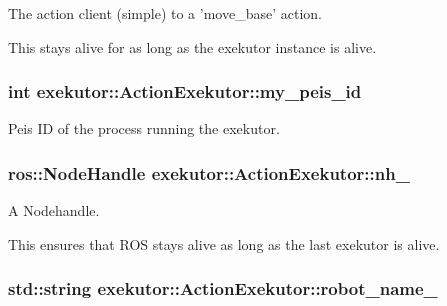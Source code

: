 \-The action client (simple) to a 'move\-\_\-base' action. 

\-This stays alive for as long as the exekutor instance is alive. \hypertarget{classexekutor_1_1ActionExekutor_a31644a88e4d0166c2d3a70bab9eb5b99}{
\subsubsection[{my\-\_\-peis\-\_\-id}]{\setlength{\rightskip}{0pt plus 5cm}int {\bf exekutor\-::\-Action\-Exekutor\-::my\-\_\-peis\-\_\-id}}}\label{classexekutor_1_1ActionExekutor_a31644a88e4d0166c2d3a70bab9eb5b99}


\-Peis \-I\-D of the process running the exekutor. 

\hypertarget{classexekutor_1_1ActionExekutor_a1f0541608c4f27f3c72ab22b1874c882}{
\subsubsection[{nh\-\_\-}]{\setlength{\rightskip}{0pt plus 5cm}ros\-::\-Node\-Handle {\bf exekutor\-::\-Action\-Exekutor\-::nh\-\_\-}}}\label{classexekutor_1_1ActionExekutor_a1f0541608c4f27f3c72ab22b1874c882}


\-A \-Nodehandle. 

\-This ensures that \-R\-O\-S stays alive as long as the last exekutor is alive. \hypertarget{classexekutor_1_1ActionExekutor_af165894bbbbabd62c17be857be095936}{
\subsubsection[{robot\-\_\-name\-\_\-}]{\setlength{\rightskip}{0pt plus 5cm}std\-::string {\bf exekutor\-::\-Action\-Exekutor\-::robot\-\_\-name\-\_\-}}}\label{classexekutor_1_1ActionExekutor_af165894bbbbabd62c17be857be095936}


